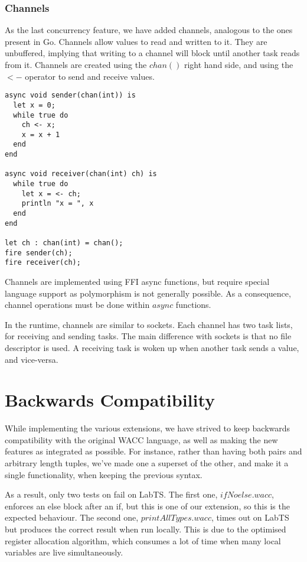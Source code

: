 \documentclass{article}
\begin{document}
\subsubsection{Channels}
As the last concurrency feature, we have added channels, analogous to the ones present in Go.
Channels allow values to read and written to it. They are unbuffered, implying that writing to a channel will block
until another task reads from it. Channels are created using the $chan()$ right hand side, and using the $<-$ operator
to send and receive values.

\begin{lstlisting}
async void sender(chan(int)) is
  let x = 0;
  while true do
    ch <- x;
    x = x + 1
  end
end

async void receiver(chan(int) ch) is
  while true do
    let x = <- ch;
    println "x = ", x
  end
end

let ch : chan(int) = chan();
fire sender(ch);
fire receiver(ch);
\end{lstlisting}

Channels are implemented using FFI async functions, but require special language support as polymorphism is not generally
possible. As a consequence, channel operations must be done within $async$ functions.

In the runtime, channels are similar to sockets. Each channel has two task lists, for receiving and sending tasks.
The main difference with sockets is that no file descriptor is used. A receiving task is woken up when another task sends
a value, and vice-versa.

\section{Backwards Compatibility}
While implementing the various extensions, we have strived to keep backwards compatibility with the original WACC language,
as well as making the new features as integrated as possible. For instance, rather than having both pairs and arbitrary length
tuples, we've made one a superset of the other, and make it a single functionality, when keeping the previous syntax.

As a result, only two tests on fail on LabTS. The first one, $ifNoelse.wacc$, enforces an else block after an if, but this
is one of our extension, so this is the expected behaviour. The second one, $printAllTypes.wacc$, times out on LabTS but
produces the correct result when run locally. This is due to the optimised register allocation algorithm, which consumes a
lot of time when many local variables are live simultaneously.
\end{document}
